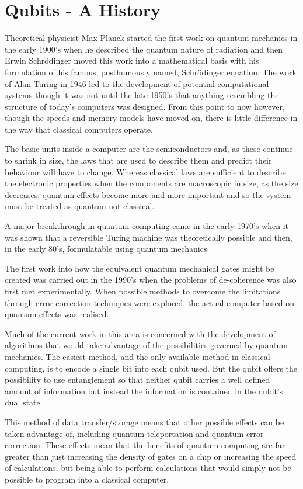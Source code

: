 
\section{Qubits - A History}
Theoretical physicist Max Planck started the first work on quantum mechanics in the early 1900's when he described the quantum nature of radiation and then Erwin Schr\"odinger moved this work into a mathematical basis with his formulation of his famous, posthumously named, Schr\"odinger equation. The work of Alan Turing in 1946\cite{turing} led to the development of potential computational systems though it was not until the late 1950's that anything resembling the structure of today's computers was designed. From this point to now however, though the speeds and memory models have moved on, there is little difference in the way that classical computers operate.

The basic units inside a computer are the semiconductors and, as these continue to shrink in size, the laws that are used to describe them and predict their behaviour will have to change. Whereas classical laws are sufficient to describe the electronic properties when the components are macroscopic in size, as the size decreases, quantum effects become more and more important and so the system must be treated as quantum not classical.

A major breakthrough in quantum computing came in the early 1970's when it was shown that a reversible Turing machine was theoretically possible \cite{bennett1973logical} and then, in the early 80's, formulatable using quantum mechanics\cite{benioffturing}.

The first work into how the equivalent quantum mechanical gates might be created was carried out in the 1990's when the problems of de-coherence was also first met experimentally. When possible methods to overcome the limitations through error correction techniques were explored\cite{PhysRevA.54.1098}, the actual computer based on quantum effects was realised. 

Much of the current work in this area is concerned with the development of algorithms that would take advantage of the possibilities governed by quantum mechanics. The easiest method, and the only available method in classical computing, is to encode a single bit into each qubit used. But the qubit offers the possibility to use entanglement so that neither qubit carries a well defined amount of information but instead the information is contained in the qubit's dual state.

This method of data transfer/storage means that other possible effects can be taken advantage of, including quantum teleportation and quantum error correction. These effects mean that the benefits of quantum computing are far greater than just increasing the density of gates on a chip or increasing the speed of calculations, but being able to perform calculations that would simply not be possible to program into a classical computer.
